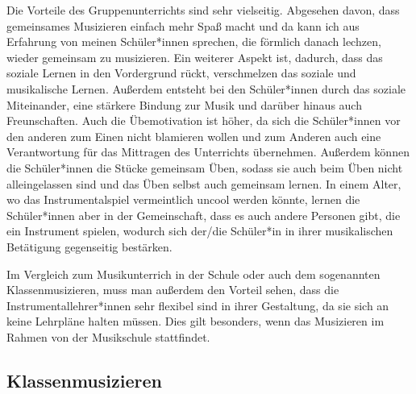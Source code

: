 Die Vorteile des Gruppenunterrichts sind sehr vielseitig. Abgesehen davon, dass
gemeinsames Musizieren einfach mehr Spaß macht und da kann ich aus Erfahrung von
meinen Schüler*innen sprechen, die förmlich danach lechzen, wieder gemeinsam zu
musizieren. Ein weiterer Aspekt ist, dadurch, dass das soziale Lernen in den
Vordergrund rückt, verschmelzen das soziale und musikalische Lernen. Außerdem
entsteht bei den Schüler*innen durch das soziale Miteinander, eine stärkere
Bindung zur Musik und darüber hinaus auch Freunschaften. Auch die Übemotivation
ist höher, da sich die Schüler*innen vor den anderen zum Einen nicht blamieren
wollen und zum Anderen auch eine Verantwortung für das Mittragen des Unterrichts
übernehmen. Außerdem können die Schüler*innen die Stücke gemeinsam Üben, sodass
sie auch beim Üben nicht alleingelassen sind und das Üben selbst auch gemeinsam
lernen. In einem Alter, wo das Instrumentalspiel vermeintlich uncool werden
könnte, lernen die Schüler*innen aber in der Gemeinschaft, dass es auch andere
Personen gibt, die ein Instrument spielen, wodurch sich der/die Schüler*in in
ihrer musikalischen Betätigung gegenseitig bestärken.
\autocite{ernst:die_zukunftsfaehige_musikschule}

Im Vergleich zum Musikunterrich in der Schule oder auch dem sogenannten
Klassenmusizieren, muss man außerdem den Vorteil sehen, dass die
Instrumentallehrer*innen sehr flexibel sind in ihrer Gestaltung, da sie sich an
keine Lehrpläne halten müssen. Dies gilt besonders, wenn das Musizieren im
Rahmen von der Musikschule stattfindet.



\subsection{Klassenmusizieren}

